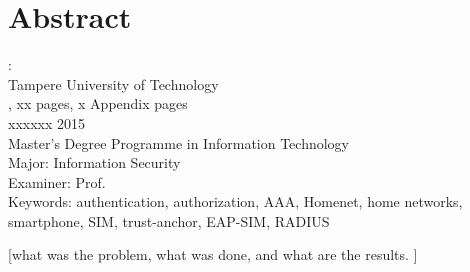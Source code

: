 \documentclass[12pt,a4paper,english]{tutthesis}
\begin{document}
\if@twoside
\clearpage
\fi


\setcounter{page}{0} %

\chapter*{Abstract}

\begin{spacing}{1.0}
  {\bf \textsf{\MakeUppercase{\@author}}}: \@title\\   %
   \textsf{Tampere University of Technology}\\
   \textsf{\@thesistype, xx pages, x Appendix pages} \\
   \textsf{xxxxxx 2015}\\
   \textsf{Master's Degree Programme in Information Technology}\\
   \textsf{Major: Information Security}\\
   \textsf{Examiner: Prof. \@examiner}\\ %
   \textsf{Keywords: authentication, authorization, AAA, Homenet, home networks, smartphone, SIM, trust-anchor, EAP-SIM, RADIUS}\\
\end{spacing}

[what was the problem, what was done, and what are the results. ]
\end{document}
